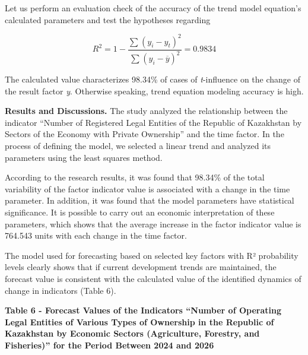Let us perform an evaluation check of the accuracy of the trend model
equation's calculated parameters and test the hypotheses regarding

\[R^{2} = 1 - \frac{\sum_{}^{}\left( y_{i} - y_{t} \right)^{2}}{\sum_{}^{}\left( y_{i} - \overline{y} \right)^{2}} = 0.9834\]

The calculated value characterizes 98.34\% of cases of
\emph{t}-influence on the change of the result factor \emph{y}.
Otherwise speaking, trend equation modeling accuracy is high.

{\bfseries Results and Discussions.} The study analyzed the relationship
between the indicator ``Number of Registered Legal Entities of the
Republic of Kazakhstan by Sectors of the Economy with Private
Ownership'' and the time factor. In the process of defining the model,
we selected a linear trend and analyzed its parameters using the least
squares method.

According to the research results, it was found that 98.34\% of the
total variability of the factor indicator value is associated with a
change in the time parameter. In addition, it was found that the model
parameters have statistical significance. It is possible to carry out an
economic interpretation of these parameters, which shows that the
average increase in the factor indicator value is 764.543 units with
each change in the time factor.

The model used for forecasting based on selected key factors with R²
probability levels clearly shows that if current development trends are
maintained, the forecast value is consistent with the calculated value
of the identified dynamics of change in indicators (Table 6).

{\bfseries Table 6 - Forecast Values of the Indicators ``Number of
Operating Legal Entities of Various Types of Ownership in the Republic
of Kazakhstan by Economic Sectors (Agriculture, Forestry, and
Fisheries)'' for the Period Between 2024 and 2026}

